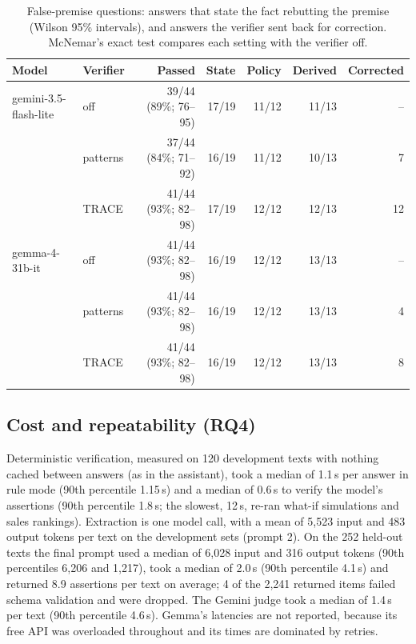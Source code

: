 \documentclass[journal]{IEEEtran}
\newcommand{\FPQGEMMA}{gemma-4-31b-it & off & 41/44 (93\%; 82--98) & 16/19 & 12/12 & 13/13 & -- \\
 & patterns & 41/44 (93\%; 82--98) & 16/19 & 12/12 & 13/13 & 4 \\
 & TRACE & 41/44 (93\%; 82--98) & 16/19 & 12/12 & 13/13 & 8 \\}
\begin{document}
\begin{table}[t]
\centering\small
\caption{False-premise questions: answers that state the fact rebutting the premise (Wilson 95\% intervals),
and answers the verifier sent back for correction. McNemar's exact test compares each setting with the
verifier off.}
\label{tab:fpq}
\begin{tabular}{@{}llrrrrr@{}}
\toprule
Model & Verifier & Passed & State & Policy & Derived & Corrected \\
\midrule
gemini-3.5-flash-lite & off & 39/44 (89\%; 76--95) & 17/19 & 11/12 & 11/13 & -- \\
 & patterns & 37/44 (84\%; 71--92) & 16/19 & 11/12 & 10/13 & 7 \\
 & TRACE & 41/44 (93\%; 82--98) & 17/19 & 12/12 & 12/13 & 12 \\
\FPQGEMMA
\bottomrule
\end{tabular}
\end{table}

\subsection{Cost and repeatability (RQ4)}
\label{sec:rq4}
Deterministic verification, measured on 120 development texts with nothing cached between answers (as in
the assistant), took a median of 1.1\,s per answer in rule mode (90th percentile 1.15\,s) and a median of
0.6\,s to verify the model's assertions (90th percentile 1.8\,s; the slowest, 12\,s, re-ran what-if
simulations and sales rankings). Extraction is one model call, with a mean of 5,523 input and 483 output
tokens per text on the development sets (prompt 2). On the 252 held-out texts the final prompt used a
median of 6,028 input and 316 output tokens (90th percentiles 6,206 and 1,217), took a median of 2.0\,s
(90th percentile 4.1\,s) and returned 8.9 assertions per text on average; 4 of the 2,241 returned items
failed schema validation and were dropped. The Gemini judge took a median of 1.4\,s per text (90th
percentile 4.6\,s). Gemma's latencies are not reported, because its free API was overloaded throughout and
its times are dominated by retries.
\end{document}
